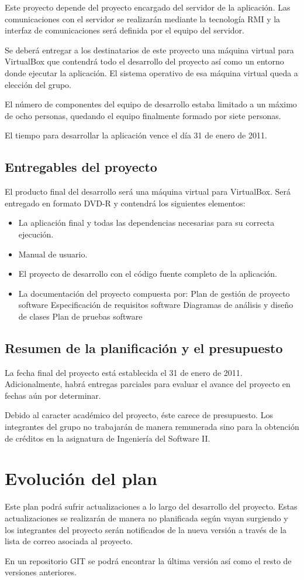 Este proyecto depende del proyecto encargado del servidor de la aplicación. Las
comunicaciones con el servidor se realizarán mediante la tecnología RMI y la
interfaz de comunicaciones será definida por el equipo del servidor.

Se deberá entregar a los destinatarios de este proyecto una máquina virtual
para VirtualBox que contendrá todo el desarrollo del proyecto así como un
entorno donde ejecutar la aplicación. El sistema operativo de esa máquina
virtual queda a elección del grupo.

El número de componentes del equipo de desarrollo estaba limitado a un máximo
de ocho personas, quedando el equipo finalmente formado por siete personas.

El tiempo para desarrollar la aplicación vence el día 31 de enero de 2011.

\subsection{Entregables del proyecto}

El producto final del desarrollo será una máquina virtual para VirtualBox. Será
entregado en formato DVD-R y contendrá los siguientes elementos:
\begin{itemize}
\item La aplicación final y todas las dependencias necesarias para su correcta
ejecución.
\item Manual de usuario.
\item El proyecto de desarrollo con el código fuente completo de la aplicación.
\item La documentación del proyecto compuesta por:
\subitem Plan de gestión de proyecto software
\subitem Especificación de requisitos software
\subitem Diagramas de análisis y diseño de clases
\subitem Plan de pruebas software
\end{itemize}

\subsection{Resumen de la planificación y el presupuesto}

La fecha final del proyecto está establecida el 31 de enero de 2011.
Adicionalmente, habrá entregas parciales para evaluar el avance del proyecto en
fechas aún por determinar.

Debido al caracter académico del proyecto, éste carece de presupuesto. Los
integrantes del grupo no trabajarán de manera remunerada sino para la obtención
de créditos en la asignatura de Ingeniería del Software II.

\section{Evolución del plan}

Este plan podrá sufrir actualizaciones a lo largo del desarrollo del proyecto.
Estas actualizaciones se realizarán de manera no planificada según vayan
surgiendo y los integrantes del proyecto serán notificados de la nueva versión
a través de la lista de correo asociada al proyecto.

En un repositorio GIT se podrá encontrar la última versión así como el resto de
versiones anteriores.
